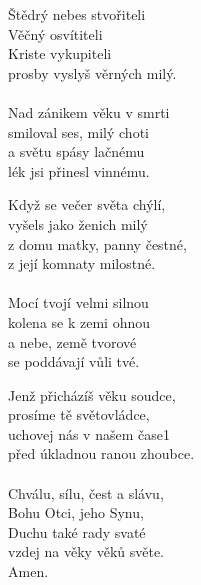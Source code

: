 \begin{translatioMulticol}{3}
Štědrý nebes stvořiteli\\
Věčný osvítiteli\\
Kriste vykupiteli\\
prosby vyslyš věrných milý.\\
\\
Nad zánikem věku v smrti\\
smiloval ses, milý choti\\
a světu spásy lačnému\\
lék jsi přinesl vinnému.\columnbreak

Když se večer světa chýlí,\\
vyšels jako ženich milý\\
z domu matky, panny čestné,\\
z její komnaty milostné.\\
\\
Mocí tvojí velmi silnou\\
kolena se k zemi ohnou\\
a nebe, země tvorové\\
se poddávají vůli tvé.\columnbreak

Jenž přicházíš věku soudce,\\
prosíme tě světovládce,\\
uchovej nás v našem čase1\\
před úkladnou ranou zhoubce.\\
\\
Chválu, sílu, čest a slávu,\\
Bohu Otci, jeho Synu,\\
Duchu také rady svaté\\
vzdej na věky věků světe.\\
Amen.
\end{translatioMulticol}
